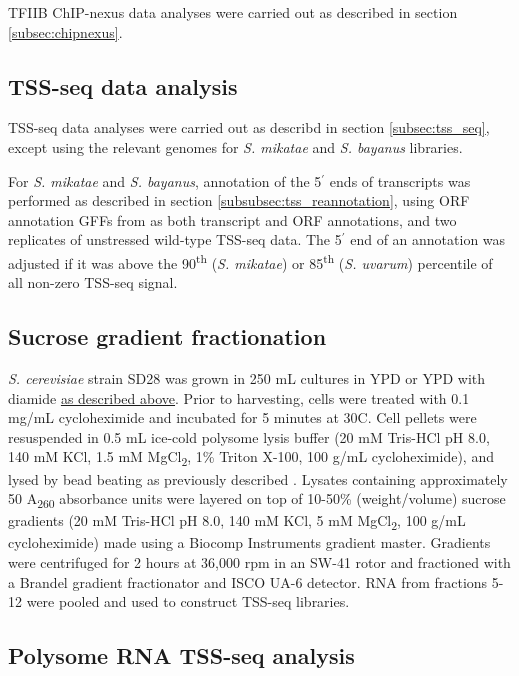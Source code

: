 TFIIB ChIP-nexus data analyses were carried out as described in section \ref{subsec:chipnexus}.

\subsection{TSS-seq data analysis}

TSS-seq data analyses were carried out as describd in section \ref{subsec:tss_seq}, except using the relevant genomes for \textit{S. mikatae} and \textit{S. bayanus} libraries.

For \textit{S. mikatae} and \textit{S. bayanus}, annotation of the 5$^\prime$ ends of transcripts was performed as described in section \ref{subsubsec:tss_reannotation}, using ORF annotation GFFs from \citet{scannell11} as both transcript and ORF annotations, and two replicates of unstressed wild-type TSS-seq data.
The 5$^\prime$ end of an annotation was adjusted if it was above the 90\textsuperscript{th} (\textit{S. mikatae}) or 85\textsuperscript{th} (\textit{S. uvarum}) percentile of all non-zero TSS-seq signal.

\subsection{Sucrose gradient fractionation}

\textit{S. cerevisiae} strain SD28 was grown in 250 mL cultures in YPD or YPD with diamide \hyperref[subsec:stress_growth_conditions]{as described above}.
Prior to harvesting, cells were treated with 0.1 mg/mL cycloheximide and incubated for 5 minutes at 30\textdegree C.
Cell pellets were resuspended in 0.5 mL ice-cold polysome lysis buffer (20 mM Tris-HCl pH 8.0, 140 mM KCl, 1.5 mM MgCl\textsubscript{2}, 1\% Triton X-100, 100 \textmu g/mL cycloheximide), and lysed by bead beating as previously described \citep{degennaro2013}.
Lysates containing approximately 50 A\textsubscript{260} absorbance units were layered on top of 10-50\% (weight/volume) sucrose gradients (20 mM Tris-HCl pH 8.0, 140 mM KCl, 5 mM MgCl\textsubscript{2}, 100 \textmu g/mL cycloheximide) made using a Biocomp Instruments gradient master.
Gradients were centrifuged for 2 hours at 36,000 rpm in an SW-41 rotor and fractioned with a Brandel gradient fractionator and ISCO UA-6 detector.
RNA from fractions 5-12 were pooled and used to construct TSS-seq libraries.

\subsection{Polysome RNA TSS-seq analysis}

